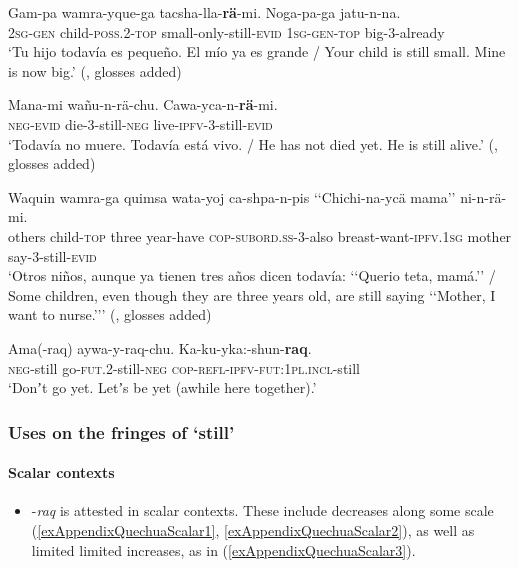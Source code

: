 \begin{exe}
	\ex\label{exAppendixQuechua1}
	\gll Gam-pa wamra-yque-ga tacsha-lla-\textbf{rä}-mi. Noga-pa-ga jatu-n-na.\\
	2\textsc{sg}-\textsc{gen} child-\textsc{poss}.2-\textsc{top} small-only-still-\textsc{evid} 1\textsc{sg}-\textsc{gen}-\textsc{top} big-3-already\\
		\glt \lq Tu hijo todavía es pequeño. El mío ya es grande / Your child is still small. Mine is now big.\rq{ }(\cite[522]{WeberEtAl2008}, glosses added)

	\ex\label{exAppendixQuechua2}
	\gll Mana-mi wañu-n-rä-chu. Cawa-yca-n-\textbf{rä}-mi.\\
	\textsc{neg}-\textsc{evid} die-3-still-\textsc{neg} live-\textsc{ipfv}-3-still-\textsc{evid}\\
	\glt \lq Todavía no muere. Todavía está vivo. / He has not died yet. He is still alive.\rq{ }(\cite[131]{WeberEtAl2008}, glosses added)
	
	\ex
	\gll Waquin wamra-ga quimsa wata-yoj ca-shpa-n-pis \lq\lq{}Chichi-na-ycä mama\rq\rq{} ni-n-rä-mi.\\
	others child-\textsc{top} three year-have \textsc{cop}-\textsc{subord}.\textsc{ss}-3-also \phantom{\lq\lq}breast-want-\textsc{ipfv}.1\textsc{sg} mother say-3-still-\textsc{evid}\\
	\glt \lq Otros niños, aunque ya tienen tres años dicen todavía: \lq\lq{}Querio teta, mamá.\rq\rq{ }/ Some children, even though they are three years old, are still saying \lq\lq{}Mother, I want to nurse.{\rq\rq{}}\rq{ }(\cite[148]{WeberEtAl2008}, glosses added)

	\ex\label{exAppendixQuechua4}
	\gll Ama\textup{(}-raq\textup{)} aywa-y-raq-chu. Ka-ku-yka:-shun-\textbf{raq}.\\
	\textsc{neg}-still go-\textsc{fut}.2-still-\textsc{neg} \textsc{cop}-\textsc{refl}-\textsc{ipfv}-\textsc{fut}:1\textsc{pl}.\textsc{incl}-still\\
	\glt \lq Donʼt go yet. Letʼs be yet (awhile here together).' \parencite[388]{Weber1989}
\end{exe}


\subsubsection{Uses on the fringes of \lq{}still\rq{}}
\paragraph{Scalar contexts}\label{appendixQuechuaScalar}
\begin{itemize}
	\item -\textit{raq} is attested in scalar contexts. These include decreases along some scale (\ref{exAppendixQuechuaScalar1}, \ref{exAppendixQuechuaScalar2}), as well as limited limited increases, as in (\ref{exAppendixQuechuaScalar3}). 
\end{itemize}

